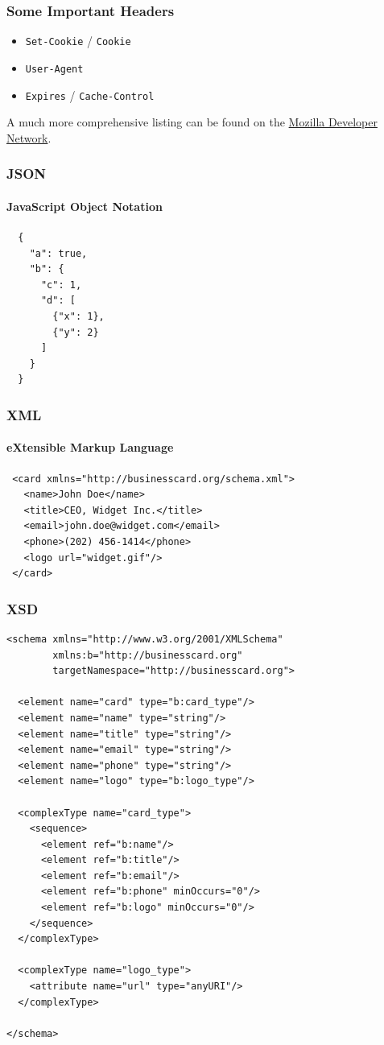 \documentclass[dvipsnames]{beamer}
\begin{document}
\begin{frame}
  \frametitle{Some Important Headers}
  \begin{itemize}
    \item \texttt{Set-Cookie} / \texttt{Cookie}
    \item \texttt{User-Agent}
    \item \texttt{Expires} / \texttt{Cache-Control}
  \end{itemize}

  A much more comprehensive listing can be found on the \href{https://developer.mozilla.org/en-US/docs/Web/HTTP/Headers}{Mozilla Developer Network}.
\end{frame}


\begin{frame}[fragile=singleslide]
  \frametitle{JSON}
  \framesubtitle{JavaScript Object Notation}
  \begin{Verbatim}
  {
    "a": true,
    "b": {
      "c": 1,
      "d": [
        {"x": 1},
        {"y": 2}
      ]
    }
  }
	\end{Verbatim}
\end{frame}


\begin{frame}[fragile=singleslide]
	\frametitle{XML}
	\framesubtitle{eXtensible Markup Language}
	\begin{Verbatim}
 <card xmlns="http://businesscard.org/schema.xml">
   <name>John Doe</name>
   <title>CEO, Widget Inc.</title>
   <email>john.doe@widget.com</email>
   <phone>(202) 456-1414</phone>
   <logo url="widget.gif"/>
 </card>
	\end{Verbatim}
\end{frame}


\begin{frame}[fragile=singleslide]
  \frametitle{XSD}
  {\tiny
  \begin{Verbatim}
<schema xmlns="http://www.w3.org/2001/XMLSchema"
        xmlns:b="http://businesscard.org"
        targetNamespace="http://businesscard.org">

  <element name="card" type="b:card_type"/>
  <element name="name" type="string"/>
  <element name="title" type="string"/>
  <element name="email" type="string"/>
  <element name="phone" type="string"/>
  <element name="logo" type="b:logo_type"/>

  <complexType name="card_type">
    <sequence>
      <element ref="b:name"/>
      <element ref="b:title"/>
      <element ref="b:email"/>
      <element ref="b:phone" minOccurs="0"/>
      <element ref="b:logo" minOccurs="0"/>
    </sequence>
  </complexType>

  <complexType name="logo_type">
    <attribute name="url" type="anyURI"/>
  </complexType>

</schema>
  \end{Verbatim}
}
\end{frame}
\end{document}

